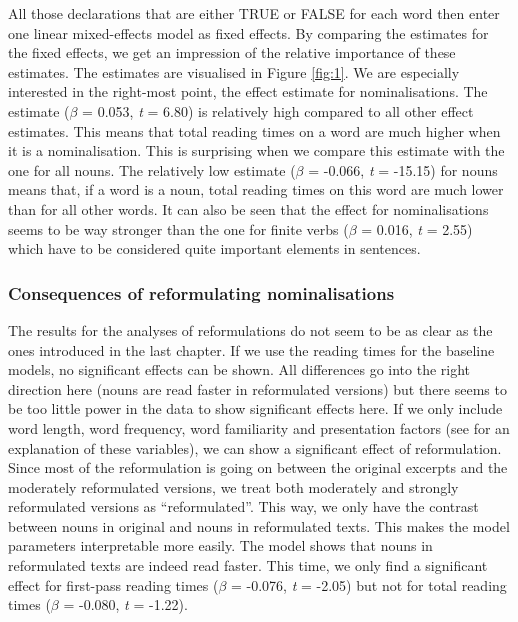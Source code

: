 \documentclass[output=paper]{langsci/langscibook}
\begin{document}
All those declarations that are either TRUE or FALSE for each word then enter one linear mixed-effects model as fixed effects. By comparing the estimates for the fixed effects, we get an impression of the relative importance of these estimates. The estimates are visualised in Figure \ref{fig:1}. We are especially interested in the right-most point, the effect estimate for nominalisations. The estimate (\textit{$\beta $} = 0.053, \textit{t} = 6.80) is relatively high compared to all other effect estimates. This means that total reading times on a word are much higher when it is a nominalisation. This is surprising when we compare this estimate with the one for all nouns. The relatively low estimate (\textit{$\beta $} = -0.066, \textit{t} = -15.15) for nouns means that, if a word is a noun, total reading times on this word are much lower than for all other words. It can also be seen that the effect for nominalisations seems to be way stronger than the one for finite verbs (\textit{$\beta $} = 0.016, \textit{t} = 2.55) which have to be considered quite important elements in sentences.

\subsubsection{Consequences of reformulating nominalisations}

The results for the analyses of reformulations do not seem to be as clear as the ones introduced in the last chapter. If we use the reading times for the baseline models, no significant effects can be shown. All differences go into the right direction here (nouns are read faster in reformulated versions) but there seems to be too little power in the data to show significant effects here. If we only include word length, word frequency, word familiarity and presentation factors (see  for an explanation of these variables), we can show a significant effect of reformulation. Since most of the reformulation is going on between the original excerpts and the moderately reformulated versions, we treat both moderately and strongly reformulated versions as “reformulated”. This way, we only have the contrast between nouns in original and nouns in reformulated texts. This makes the model parameters interpretable more easily. The model shows that nouns in reformulated texts are indeed read faster. This time, we only find a significant effect for first-pass reading times (\textit{$\beta $} = -0.076, \textit{t} = -2.05) but not for total reading times (\textit{$\beta $} = -0.080, \textit{t} = -1.22).
\end{document}
